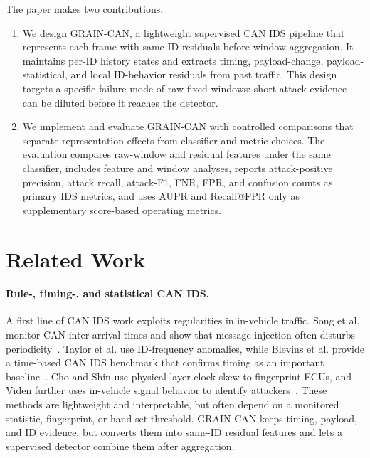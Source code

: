\documentclass[runningheads]{llncs}
\newcommand{\method}{GRAIN-CAN}
\begin{document}
The paper makes two contributions.
\begin{enumerate}
\item We design \method{}, a lightweight supervised CAN IDS pipeline that represents each frame with same-ID residuals before window aggregation. It maintains per-ID history states and extracts timing, payload-change, payload-statistical, and local ID-behavior residuals from past traffic. This design targets a specific failure mode of raw fixed windows: short attack evidence can be diluted before it reaches the detector.
\item We implement and evaluate \method{} with controlled comparisons that separate representation effects from classifier and metric choices. The evaluation compares raw-window and residual features under the same classifier, includes feature and window analyses, reports attack-positive precision, attack recall, attack-F1, FNR, FPR, and confusion counts as primary IDS metrics, and uses AUPR and Recall@FPR only as supplementary score-based operating metrics.
\end{enumerate}




\section{Related Work}
\paragraph{Rule-, timing-, and statistical CAN IDS.}
A first line of CAN IDS work exploits regularities in in-vehicle traffic. Song et al. monitor CAN inter-arrival times and show that message injection often disturbs periodicity~\cite{song2016intrusion}. Taylor et al. use ID-frequency anomalies, while Blevins et al. provide a time-based CAN IDS benchmark that confirms timing as an important baseline~\cite{taylor2016frequency,blevins2021time}. Cho and Shin use physical-layer clock skew to fingerprint ECUs, and Viden further uses in-vehicle signal behavior to identify attackers~\cite{cho2016fingerprinting,cho2017viden}. These methods are lightweight and interpretable, but often depend on a monitored statistic, fingerprint, or hand-set threshold. \method{} keeps timing, payload, and ID evidence, but converts them into same-ID residual features and lets a supervised detector combine them after aggregation.
\end{document}
